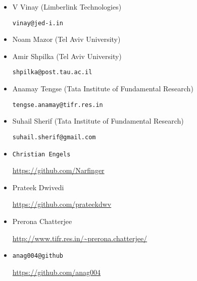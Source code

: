 \begin{itemize}
\item V Vinay (Limberlink Technologies)

\texttt{vinay@jed-i.in}

\item Noam Mazor (Tel Aviv University)

\item Amir Shpilka (Tel Aviv University)

\texttt{shpilka@post.tau.ac.il}

\item Anamay Tengse (Tata Institute of Fundamental Research)

\texttt{tengse.anamay@tifr.res.in}

\item Suhail Sherif (Tata Institute of Fundamental Research)

\texttt{suhail.sherif@gmail.com}

\item \texttt{Christian Engels}

  \url{https://github.com/Narfinger}

\item Prateek Dwivedi

  \url{https://github.com/prateekdwv}

\item Prerona Chatterjee

  \url{http://www.tifr.res.in/~prerona.chatterjee/}

\item \texttt{anag004@github}

  \url{https://github.com/anag004}

\end{itemize}


